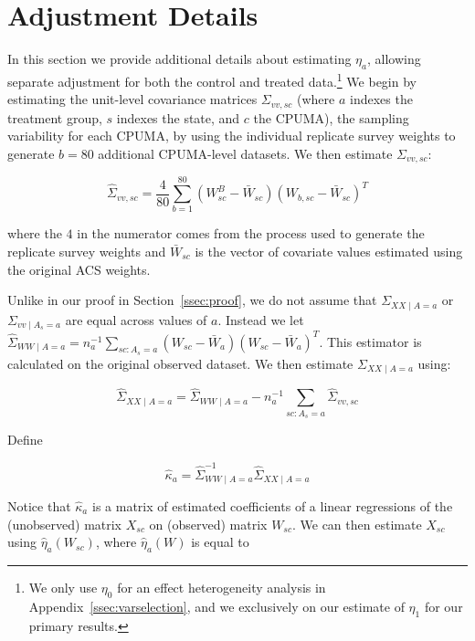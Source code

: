 \section{Adjustment Details}

In this section we provide additional details about estimating $\eta_a$, allowing separate adjustment for both the control and treated data.\footnote{We only use $\eta_0$ for an effect heterogeneity analysis in Appendix~\ref{ssec:varselection}, and we exclusively on our estimate of $\eta_1$ for our primary results.} We begin by estimating the unit-level covariance matrices $\Sigma_{vv, sc}$ (where $a$ indexes the treatment group, $s$ indexes the state, and $c$ the CPUMA), the sampling variability for each CPUMA, by using the individual replicate survey weights to generate $b = 80$ additional CPUMA-level datasets. We then estimate $\Sigma_{vv, sc}$:

\begin{equation}
\hat{\Sigma}_{vv, sc} = \frac{4}{80}\sum_{b=1}^{80}(W_{sc}^B - \bar{W}_{sc})(W_{b, sc} - \bar{W}_{sc})^T
\end{equation}

where the $4$ in the numerator comes from the process used to generate the replicate survey weights and $\bar{W}_{sc}$ is the vector of covariate values estimated using the original ACS weights.

Unlike in our proof in Section~\ref{ssec:proof}, we do not assume that $\Sigma_{XX \mid A = a}$ or $\Sigma_{vv \mid A_s = a}$ are equal across values of $a$. Instead we let $\hat{\Sigma}_{WW \mid A = a} = n_a^{-1}\sum_{sc: A_s = a} (W_{sc} - \bar{W}_a)(W_{sc} - \bar{W}_a)^T$. This estimator is calculated on the original observed dataset. We then estimate $\Sigma_{XX \mid A = a}$ using:

\begin{equation}
\hat{\Sigma}_{XX \mid A = a} = \hat{\Sigma}_{WW \mid A = a} - n_a^{-1}\sum_{sc: A_s = a} \hat{\Sigma}_{vv, sc}
\end{equation}

Define

\begin{equation}
\hat{\kappa}_a = \hat{\Sigma}_{WW \mid A = a}^{-1}\hat{\Sigma}_{XX \mid A = a}
\end{equation}

Notice that $\hat{\kappa}_a$ is a matrix of estimated coefficients of a linear regressions of the (unobserved) matrix $X_{sc}$ on (observed) matrix $W_{sc}$. We can then estimate $X_{sc}$ using $\hat{\eta}_a(W_{sc})$, where $\hat{\eta}_a(W)$ is equal to

